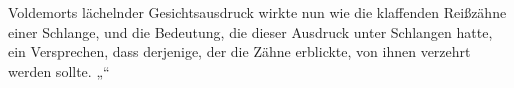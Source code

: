 Voldemorts lächelnder Gesichtsausdruck wirkte nun wie die klaffenden Reißzähne einer Schlange, und die Bedeutung, die dieser Ausdruck unter Schlangen hatte, ein Versprechen, dass derjenige, der die Zähne erblickte, von ihnen verzehrt werden sollte.
„“

